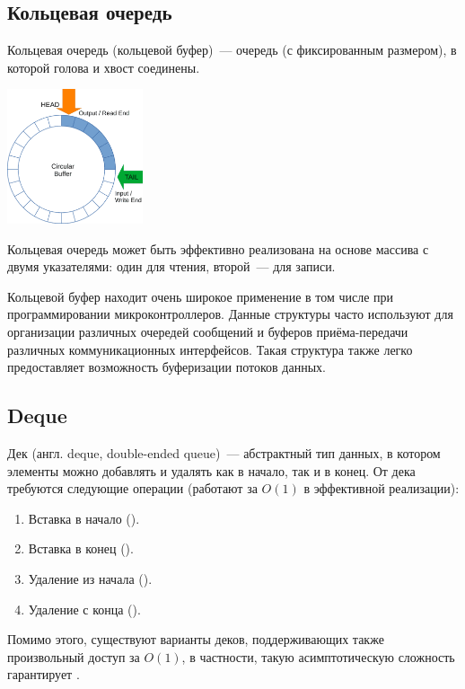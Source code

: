 \subsection{Кольцевая очередь}
Кольцевая очередь (кольцевой буфер)~--- очередь (с фиксированным размером), в которой голова и хвост соединены.

\begin{center}
  \includegraphics[width=0.3\textwidth]{resources/19-26/ring.png}
\end{center}

Кольцевая очередь может быть эффективно реализована на основе массива с двумя указателями: один для чтения, второй~--- для записи.

Кольцевой буфер находит очень широкое применение в том числе при программировании микроконтроллеров.
Данные структуры часто используют для организации различных очередей сообщений и буферов приёма-передачи различных
коммуникационных интерфейсов. Такая структура также легко предоставляет возможность буферизации потоков данных.

\subsection{Deque}
Дек (англ. deque, double-ended queue)~--- абстрактный тип данных, в котором элементы можно добавлять и удалять как в начало, так и в конец.
От дека требуются следующие операции (работают за \(O(1)\) в эффективной реализации):
\begin{enumerate}
  \item Вставка в начало ().
  \item Вставка в конец ().
  \item Удаление из начала ().
  \item Удаление с конца ().
\end{enumerate}

Помимо этого, существуют варианты деков, поддерживающих также произвольный доступ за \(O(1)\), в частности, такую асимптотическую
сложность гарантирует .

